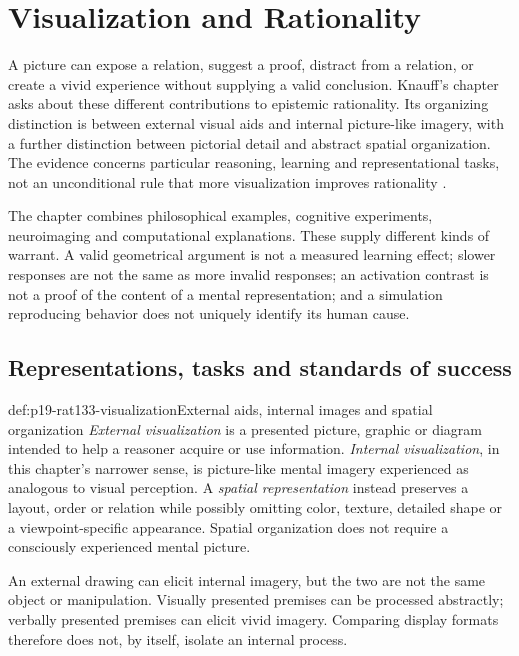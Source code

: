 \chapter{Visualization and Rationality}
\label{sec:p19-rationality-13-3}

A picture can expose a relation, suggest a proof, distract from a relation,
or create a vivid experience without supplying a valid conclusion. Knauff's
chapter asks about these different contributions to epistemic rationality.
Its organizing distinction is between external visual aids and internal
picture-like imagery, with a further distinction between pictorial detail
and abstract spatial organization. The evidence concerns particular
reasoning, learning and representational tasks, not an unconditional rule
that more visualization improves rationality
\parencite[pp.~735--744]{Knauff2021VisualizationRationality}.

The chapter combines philosophical examples, cognitive experiments,
neuroimaging and computational explanations. These supply different kinds
of warrant. A valid geometrical argument is not a measured learning effect;
slower responses are not the same as more invalid responses; an activation
contrast is not a proof of the content of a mental representation; and a
simulation reproducing behavior does not uniquely identify its human cause.

\section{Representations, tasks and standards of success}
\label{sec:p19-rat133-distinctions}

\begin{hbdefinition}{def:p19-rat133-visualization}{External aids, internal images and spatial organization}
\emph{External visualization} is a presented picture, graphic or diagram
intended to help a reasoner acquire or use information. \emph{Internal
visualization}, in this chapter's narrower sense, is picture-like mental
imagery experienced as analogous to visual perception. A \emph{spatial
representation} instead preserves a layout, order or relation while possibly
omitting color, texture, detailed shape or a viewpoint-specific appearance.
Spatial organization does not require a consciously experienced mental picture.

An external drawing can elicit internal imagery, but the two are not the
same object or manipulation. Visually presented premises can be processed
abstractly; verbally presented premises can elicit vivid imagery. Comparing
display formats therefore does not, by itself, isolate an internal process.
\end{hbdefinition}

